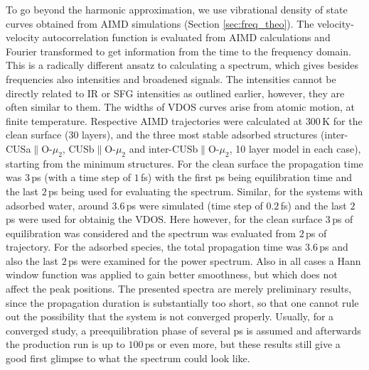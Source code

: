 \documentclass[11pt,DIV=13,BCOR=5mm,a4paper,headinclude]{scrbook}
\begin{document}
To go beyond the harmonic approximation, we use vibrational density of state curves obtained from AIMD simulations (Section \ref{sec:freq_theo}).
The velocity-velocity autocorrelation function is evaluated from AIMD calculations and Fourier transformed to get information from the time to the frequency domain.
This is a radically different ansatz to calculating a spectrum, which gives besides frequencies also intensities and broadened signals.
The intensities cannot be directly related to IR or SFG intensities as outlined earlier, however, they are often similar to them\cite{Melani2018}.
The widths of VDOS curves arise from atomic motion, at finite temperature.
Respective AIMD trajectories were calculated at $300\,$K for the clean surface (30 layers), and the three most stable adsorbed structures (inter-CUSa$\parallel$O-$\mu_2$, CUSb$\parallel$O-$\mu_2$ and inter-CUSb$\parallel$O-$\mu_2$, 10 layer model in each case), starting from the minimum structures.
For the clean surface the propagation time was $3\,$ps (with a time step of $1\,$fs) with the first ps being equilibration time and the last $2\,$ps being used for evaluating the spectrum.
Similar, for the systems with adsorbed water, around $3.6\,$ps were simulated (time step of $0.2\,$fs) and the last $2\,$ps were used for obtainig the VDOS.
Here however, for the clean surface $3\,$ps of equilibration was considered and the spectrum was evaluated from $2\,$ps of trajectory.
For the adsorbed species, the total propagation time was $3.6\,$ps and also the last $2\,$ps were examined for the power spectrum.
Also in all cases a Hann window function was applied\cite{Ohto2015} to gain better smoothness, but which does not affect the peak positions.
The presented spectra are merely preliminary results, since the propagation duration is substantially too short, so that one cannot rule out the possibility that the system is not converged properly.
Usually, for a converged study, a preequilibration phase of several ps is assumed and afterwards the production run is up to $100\,$ps or even more, but these results still give a good first glimpse to what the spectrum could look like.
\end{document}
